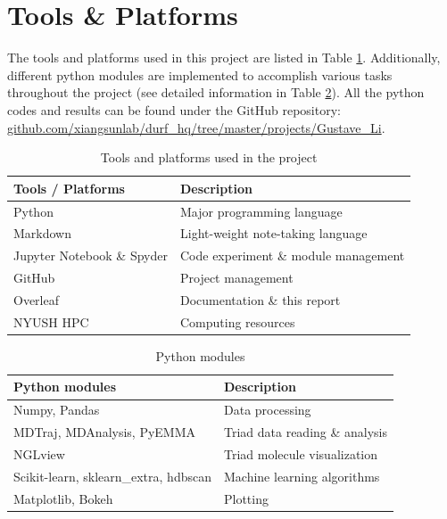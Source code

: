 \documentclass[a4paper]{article}
\begin{document}
\section{Tools \& Platforms}

The tools and platforms used in this project are listed in Table \ref{table: tools & platforms}. Additionally, different python modules are implemented to accomplish various tasks throughout the project (see detailed information in Table \ref{table: python modules}). All the python codes and results can be found under the GitHub repository: \href{https://github.com/xiangsunlab/durf_hq/tree/master/projects/Gustave_Li}{github.com/xiangsunlab/durf\_hq/tree/master/projects/Gustave\_Li}.

\begin{table}[h!]
    \centering
    \caption{Tools and platforms used in the project} 
    \begin{tabular}{l|l}
    \hline \hline
        \textbf{Tools / Platforms} & \textbf{Description} \\
        \hline
        Python & Major programming language \\
        Markdown & Light-weight note-taking language \\
        Jupyter Notebook \& Spyder & Code experiment \& module management \\
        GitHub & Project management \\
        Overleaf & Documentation \& this report \\
        NYUSH HPC & Computing resources \\
        \hline \hline
    \end{tabular}
    \label{table: tools & platforms}
\end{table}

\begin{table}[H]
    \centering
    \caption{Python modules}
    \begin{tabular}{l|l}
    \hline \hline
        \textbf{Python modules} & \textbf{Description} \\
        \hline
        Numpy, Pandas & Data processing \\
        MDTraj\cite{MDTraj}, MDAnalysis\cite{MDAnalysis_1}\cite{MDAnalysis_2}, PyEMMA \cite{pyemma}     & Triad data reading \& analysis \\
        NGLview\cite{NGLview} & Triad molecule visualization \\
        Scikit-learn\cite{scikit-learn}, sklearn\_extra, hdbscan\cite{hdbscan} & Machine learning algorithms \\
        Matplotlib, Bokeh & Plotting \\
        \hline \hline
    \end{tabular}
    \label{table: python modules}
\end{table}
\end{document}
